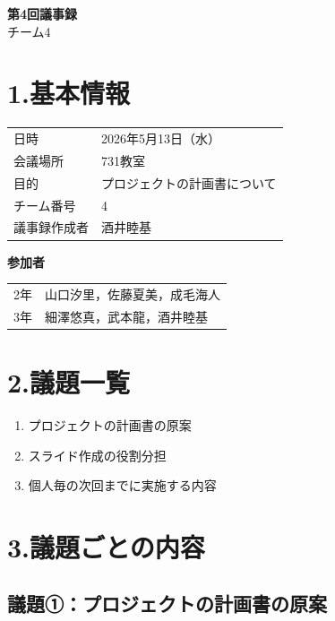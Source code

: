 \documentclass[a4paper,12pt]{ltjsarticle}
\begin{document}
\begin{center}
  {\Large \textbf{第4回議事録}}\\[8pt]
  {\large チーム4}
\end{center}

\vspace{4mm}

\section*{1.基本情報}
\begin{tabular}{ll}
  \toprule
  日時     & 2026年5月13日（水） \\
  会議場所 & 731教室 \\
  目的     & プロジェクトの計画書について \\
  チーム番号 & 4 \\
  議事録作成者 & 酒井睦基 \\
  \bottomrule
\end{tabular}

\vspace{4mm}
\noindent\textbf{参加者}

\begin{tabular}{ll}
  2年 & 山口汐里，佐藤夏美，成毛海人 \\
  3年 & 細澤悠真，武本龍，酒井睦基 \\
\end{tabular}

\section*{2.議題一覧}
\begin{enumerate}[label=議題\arabic*：]
  \item プロジェクトの計画書の原案
  \item スライド作成の役割分担
  \item 個人毎の次回までに実施する内容
\end{enumerate}

\section*{3.議題ごとの内容}

\subsection*{議題①：プロジェクトの計画書の原案}
\end{document}
